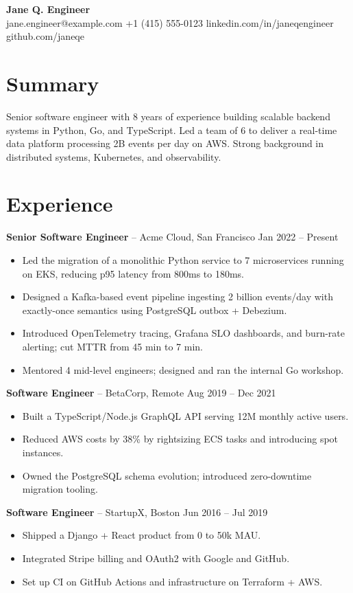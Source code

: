 \documentclass{article}
\begin{document}
\begin{center}
{\Large \textbf{Jane Q. Engineer}}\\
jane.engineer@example.com \quad +1 (415) 555-0123 \quad linkedin.com/in/janeqengineer \quad github.com/janeqe
\end{center}

\section*{Summary}
Senior software engineer with 8 years of experience building scalable backend systems in Python, Go, and TypeScript. Led a team of 6 to deliver a real-time data platform processing 2B events per day on AWS. Strong background in distributed systems, Kubernetes, and observability.

\section*{Experience}

\textbf{Senior Software Engineer} -- Acme Cloud, San Francisco \hfill Jan 2022 -- Present
\begin{itemize}
  \item Led the migration of a monolithic Python service to 7 microservices running on EKS, reducing p95 latency from 800ms to 180ms.
  \item Designed a Kafka-based event pipeline ingesting 2 billion events/day with exactly-once semantics using PostgreSQL outbox + Debezium.
  \item Introduced OpenTelemetry tracing, Grafana SLO dashboards, and burn-rate alerting; cut MTTR from 45 min to 7 min.
  \item Mentored 4 mid-level engineers; designed and ran the internal Go workshop.
\end{itemize}

\textbf{Software Engineer} -- BetaCorp, Remote \hfill Aug 2019 -- Dec 2021
\begin{itemize}
  \item Built a TypeScript/Node.js GraphQL API serving 12M monthly active users.
  \item Reduced AWS costs by 38\% by rightsizing ECS tasks and introducing spot instances.
  \item Owned the PostgreSQL schema evolution; introduced zero-downtime migration tooling.
\end{itemize}

\textbf{Software Engineer} -- StartupX, Boston \hfill Jun 2016 -- Jul 2019
\begin{itemize}
  \item Shipped a Django + React product from 0 to 50k MAU.
  \item Integrated Stripe billing and OAuth2 with Google and GitHub.
  \item Set up CI on GitHub Actions and infrastructure on Terraform + AWS.
\end{itemize}
\end{document}
